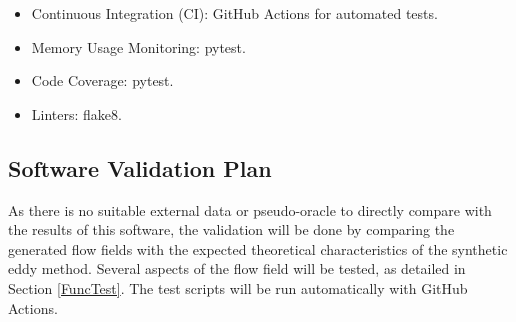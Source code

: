 \documentclass[12pt, titlepage]{article}
\begin{document}
\begin{itemize}
  \item Continuous Integration (CI): GitHub Actions for automated tests.
  \item Memory Usage Monitoring: pytest.
  \item Code Coverage: pytest.
  \item Linters: flake8.
\end{itemize}




\subsection{Software Validation Plan}

As there is no suitable external data or pseudo-oracle to directly compare with the results of this software, the validation will be done by comparing the generated flow fields with the expected theoretical characteristics of the synthetic eddy method. Several aspects of the flow field will be tested, as detailed in Section \ref{FuncTest}. The test scripts will be run automatically with GitHub Actions.



\end{document}
